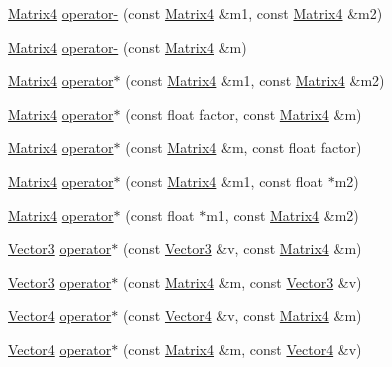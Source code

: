 \begin{DoxyCompactItemize}
\hyperlink{classprism_1_1_matrix4}{Matrix4} \hyperlink{namespaceprism_a34a2f64f209065f753bed62a880b75b6}{operator-\/} (const \hyperlink{classprism_1_1_matrix4}{Matrix4} \&m1, const \hyperlink{classprism_1_1_matrix4}{Matrix4} \&m2)
\item 
\hyperlink{classprism_1_1_matrix4}{Matrix4} \hyperlink{namespaceprism_a879d3410d690b5722a9af17297f38fbb}{operator-\/} (const \hyperlink{classprism_1_1_matrix4}{Matrix4} \&m)
\item 
\hyperlink{classprism_1_1_matrix4}{Matrix4} \hyperlink{namespaceprism_a9ae44fb46bb709a5c8f4d592baf65522}{operator$\ast$} (const \hyperlink{classprism_1_1_matrix4}{Matrix4} \&m1, const \hyperlink{classprism_1_1_matrix4}{Matrix4} \&m2)
\item 
\hyperlink{classprism_1_1_matrix4}{Matrix4} \hyperlink{namespaceprism_ab3639f7bd46a54726522dfe406841ea9}{operator$\ast$} (const float factor, const \hyperlink{classprism_1_1_matrix4}{Matrix4} \&m)
\item 
\hyperlink{classprism_1_1_matrix4}{Matrix4} \hyperlink{namespaceprism_a4073983f089695c40b6fd20d892175f9}{operator$\ast$} (const \hyperlink{classprism_1_1_matrix4}{Matrix4} \&m, const float factor)
\item 
\hyperlink{classprism_1_1_matrix4}{Matrix4} \hyperlink{namespaceprism_aa2859acb8e8dd6fea8678e14249e561d}{operator$\ast$} (const \hyperlink{classprism_1_1_matrix4}{Matrix4} \&m1, const float $\ast$m2)
\item 
\hyperlink{classprism_1_1_matrix4}{Matrix4} \hyperlink{namespaceprism_a5e83bcd69595728106bed838aeb32f70}{operator$\ast$} (const float $\ast$m1, const \hyperlink{classprism_1_1_matrix4}{Matrix4} \&m2)
\item 
\hyperlink{classprism_1_1_vector3}{Vector3} \hyperlink{namespaceprism_a95ceb3342a808c88d0bb7c1f7e0ef82b}{operator$\ast$} (const \hyperlink{classprism_1_1_vector3}{Vector3} \&v, const \hyperlink{classprism_1_1_matrix4}{Matrix4} \&m)
\item 
\hyperlink{classprism_1_1_vector3}{Vector3} \hyperlink{namespaceprism_a04f1e6e0f84169fce23b236e0312d6a0}{operator$\ast$} (const \hyperlink{classprism_1_1_matrix4}{Matrix4} \&m, const \hyperlink{classprism_1_1_vector3}{Vector3} \&v)
\item 
\hyperlink{classprism_1_1_vector4}{Vector4} \hyperlink{namespaceprism_a5a10d8ea1e63b19d02bd294e4ebabb1b}{operator$\ast$} (const \hyperlink{classprism_1_1_vector4}{Vector4} \&v, const \hyperlink{classprism_1_1_matrix4}{Matrix4} \&m)
\item 
\hyperlink{classprism_1_1_vector4}{Vector4} \hyperlink{namespaceprism_ad125bd8304d577b6f879fb973f774eb8}{operator$\ast$} (const \hyperlink{classprism_1_1_matrix4}{Matrix4} \&m, const \hyperlink{classprism_1_1_vector4}{Vector4} \&v)

\end{DoxyCompactItemize}
